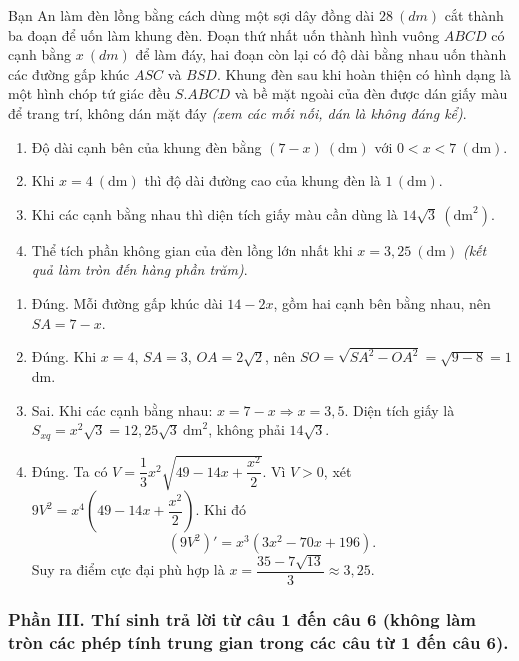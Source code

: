 \begin{baitap}
	Bạn An làm đèn lồng bằng cách dùng một sợi dây đồng dài $\SI{28}{(dm)}$ cắt thành ba đoạn để uốn làm khung đèn. Đoạn thứ nhất uốn thành hình vuông $ABCD$ có cạnh bằng $x\ (\si{dm})$ để làm đáy, hai đoạn còn lại có độ dài bằng nhau uốn thành các đường gấp khúc $ASC$ và $BSD$. Khung đèn sau khi hoàn thiện có hình dạng là một hình chóp tứ giác đều $S.ABCD$ và bề mặt ngoài của đèn được dán giấy màu để trang trí, không dán mặt đáy \textit{(xem các mối nối, dán là không đáng kể)}.
	\begin{enumerate}
		\item Độ dài cạnh bên của khung đèn bằng $(7 - x)\ (\text{dm})$ với $0 < x < 7\ (\text{dm})$.
		\item Khi $x = 4\ (\text{dm})$ thì độ dài đường cao của khung đèn là $1\, (\text{dm})$.
		\item Khi các cạnh bằng nhau thì diện tích giấy màu cần dùng là $14\sqrt{3}\ (\text{dm}^2)$.
		\item Thể tích phần không gian của đèn lồng lớn nhất khi $x = 3,25\ (\text{dm})$ \textit{(kết quả làm tròn đến hàng phần trăm)}.
	\end{enumerate}
	\begin{traloi}
		
		\begin{enumerate}
			\item Đúng. Mỗi đường gấp khúc dài \(14-2x\), gồm hai cạnh bên bằng nhau, nên \(SA=7-x\).
			
			\item Đúng. Khi \(x=4\), \(SA=3\), \(OA=2\sqrt2\), nên \(SO=\sqrt{SA^2-OA^2}=\sqrt{9-8}=1\) dm.
			
			\item Sai. Khi các cạnh bằng nhau: \(x=7-x\Rightarrow x=3{,}5\). Diện tích giấy là \(S_{xq}=x^2\sqrt3=12{,}25\sqrt3\ \text{dm}^2\), không phải \(14\sqrt3\).
			
			\item Đúng. Ta có \(V=\dfrac13x^2\sqrt{49-14x+\dfrac{x^2}{2}}\). Vì \(V>0\), xét \(9V^2=x^4\left(49-14x+\dfrac{x^2}{2}\right)\). Khi đó
			\[
			(9V^2)'=x^3(3x^2-70x+196).
			\]
			Suy ra điểm cực đại phù hợp là \(x=\dfrac{35-7\sqrt{13}}{3}\approx3{,}25\).
		\end{enumerate}
	\end{traloi}
\end{baitap}


\subsubsection*{Phần III. Thí sinh trả lời từ câu 1 đến câu 6 (không làm tròn các phép tính trung gian trong các câu từ 1 đến câu 6).}
\setcounter{bt}{0}

